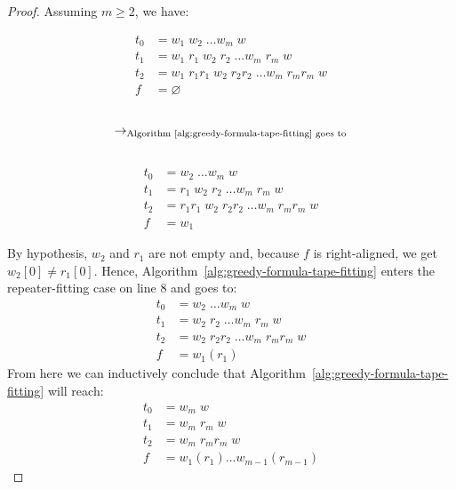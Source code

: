 \begin{proof}
    Assuming $m\geq 2$, we have:
    \setlength{\columnsep}{-1.9cm}
    \begin{multicols}{3}
        \noindent
        \begin{align*}
            t_0 & = w_1\; w_2\;\dots w_m\; w                              \\
            t_1 & = w_1\; r_1\; w_2\; r_2\; \dots w_m\; r_m\; w           \\
            t_2 & = w_1\; r_1r_1\; w_2\;  r_2r_2\; \dots w_m\; r_mr_m\; w \\
            f   & = \varnothing
        \end{align*}
        \begin{align*}
             &                                                                   \\
            \to_{\text{Algorithm~\ref{alg:greedy-formula-tape-fitting} goes to}} \\
             &
        \end{align*}
        \begin{align*}
            t_0 & = w_2\;\dots w_m\; w                              \\
            t_1 & = r_1\; w_2\; r_2\; \dots w_m\; r_m\; w           \\
            t_2 & = r_1r_1\; w_2\;  r_2r_2\; \dots w_m\; r_mr_m\; w \\
            f   & = w_1
        \end{align*}
    \end{multicols}
    By hypothesis, $w_2$ and $r_1$ are not empty and, because $f$ is right-aligned, we get $w_2[0] \neq r_1[0]$. Hence, Algorithm~\ref{alg:greedy-formula-tape-fitting} enters the repeater-fitting case on line 8 and goes to:
    \begin{align*}
        t_0 & = w_2\;\dots w_m\; w                     \\
        t_1 & = w_2\; r_2\; \dots w_m\; r_m\; w        \\
        t_2 & = w_2\;  r_2r_2\; \dots w_m\; r_mr_m\; w \\
        f   & = w_1 (r_1)
    \end{align*}
    From here we can inductively conclude that Algorithm~\ref{alg:greedy-formula-tape-fitting} will reach:
    \begin{align*}
        t_0 & = w_m\; w                           \\
        t_1 & = w_m\; r_m\; w                     \\
        t_2 & = w_m\; r_mr_m\; w                  \\
        f   & = w_1 (r_1) \dots w_{m-1} (r_{m-1})
    \end{align*}


\end{proof}
